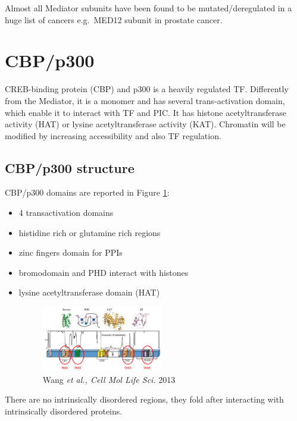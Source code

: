 Almost all Mediator subunits have been found to be mutated/deregulated in a huge list of cancers e.g.~MED12 subunit in prostate cancer.


\hypertarget{cbpp300}{%
\section{CBP/p300}\label{cbpp300}}

CREB-binding protein (CBP) and p300 is a heavily regulated TF. Differently from the Mediator, it is a monomer and has several trans-activation domain, which enable it to interact with TF and PIC. It has histone acetyltransferase activity (HAT) or lysine acetyltransferase activity (KAT). Chromatin will be modified by increasing accessibility and also TF regulation.

\hypertarget{crepp300-structure}{%
\subsection{CBP/p300 structure}\label{crepp300-structure}}
CBP/p300 domains are reported in Figure \ref{fig:cbp_domain}:
\begin{itemize}
\item
  4 transactivation domains
\item
  histidine rich or glutamine rich regions
\item
  zinc fingers domain for PPIs
\item
  bromodomain and PHD interact with histones
\item
  lysine acetyltransferase domain (HAT)

  \begin{figure}
  \centering
  \includegraphics[width=0.5\textwidth]{../_resources/Screenshot_2022-10-12_at_08-56-06.png}
  \caption{Wang \emph{et al., Cell Mol Life Sci.} 2013}
  \label{fig:cbp_domain}
  \end{figure}

\end{itemize}

There are no intrinsically disordered regions, they fold after interacting with intrinsically disordered proteins.

